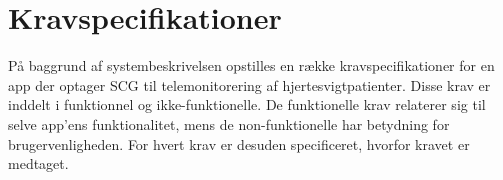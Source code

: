 
\section{Kravspecifikationer}
På baggrund af systembeskrivelsen opstilles en række kravspecifikationer for en app der optager SCG til telemonitorering af hjertesvigtpatienter. Disse krav er inddelt i funktionnel og ikke-funktionelle. De funktionelle krav relaterer sig til selve app'ens funktionalitet, mens de non-funktionelle har betydning for brugervenligheden. For hvert krav er desuden specificeret, hvorfor kravet er medtaget.


